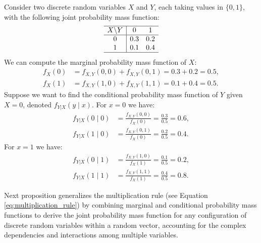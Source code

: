 \begin{example}
Consider two discrete random variables \( X \) and \( Y \), each taking values in \( \{0, 1\} \), with the following joint probability mass function:
\[
\begin{array}{c|cc}
\hline
X \backslash Y & 0 & 1 \\
\hline
0 & 0.3 & 0.2 \\
1 & 0.1 & 0.4 \\
\hline
\end{array}
\]
We can compute the marginal probability mass function of \( X \):
\[
\begin{aligned}
f_{X}(0) &= f_{X,Y}(0,0) + f_{X,Y}(0,1) = 0.3 + 0.2 = 0.5, \\
f_{X}(1) &= f_{X,Y}(1,0) + f_{X,Y}(1,1) = 0.1 + 0.4 = 0.5.
\end{aligned}
\]
Suppose we want to find the conditional probability mass function of \( Y \) given \( X = 0 \), denoted \( f_{Y|X}(y \mid x) \). For \( x = 0 \) we have:
\[
\begin{aligned}
f_{Y|X}(0 \mid 0) &= \frac{f_{X,Y}(0,0)}{f_{X}(0)} = \frac{0.3}{0.5} = 0.6, \\
f_{Y|X}(1 \mid 0) &= \frac{f_{X,Y}(0,1)}{f_{X}(0)} = \frac{0.2}{0.5} = 0.4.
\end{aligned}
\]
For \( x = 1 \) we have:
\[
\begin{aligned}
f_{Y|X}(0 \mid 1) &= \frac{f_{X,Y}(1,0)}{f_{X}(1)} = \frac{0.1}{0.5} = 0.2, \\
f_{Y|X}(1 \mid 1) &= \frac{f_{X,Y}(1,1)}{f_{X}(1)} = \frac{0.4}{0.5} = 0.8.
\end{aligned}
\]
\end{example}

Next proposition generalizes the multiplication rule (see Equation \ref{eq:multiplication_rule}) by combining marginal and conditional probability mass functions to derive the joint probability mass function for any configuration of discrete random variables within a random vector, accounting for the complex dependencies and interactions among multiple variables.

